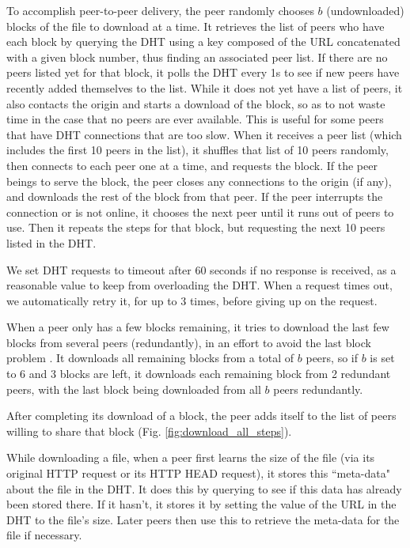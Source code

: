 To accomplish peer-to-peer delivery, the peer randomly chooses $b$ (undownloaded) blocks of the file to download at a time.  
It retrieves the list of peers who have each block by querying the DHT using a key composed of
the URL concatenated with a given block number, thus finding an associated peer list.  
If there are no peers listed yet for that block, it polls the DHT every 1s to see if new peers have recently added themselves to the list.
While it does not yet have a list of peers, it also contacts the origin and starts a download of the block, so as to 
not waste time in the case that no peers are ever available.  This is useful for some peers that have DHT connections that are too slow.
When it receives a peer list (which includes the first 10 peers in the list), it shuffles that list of 10 peers randomly, then connects to each peer one at a time, and requests the block.  
If the peer beings to serve the block, the peer closes any connections to the origin (if any), and downloads the rest of the block from that peer.  If the peer interrupts the connection
or is not online, it chooses the next peer until it runs out of peers to use.  Then it repeats the steps for that block, but requesting the next 10 peers listed in the DHT.

We set DHT requests to timeout after 60 seconds if no response is received, as a reasonable value to keep from 
overloading the DHT.  When a request times out, we automatically retry it, for up to 3 times, before giving up on the request.

When a peer only has a few blocks remaining, it tries to download the last few blocks from several peers (redundantly), in an effort to avoid the last block problem \cite{bram}.  
It downloads all remaining blocks from a total of $b$ peers, so if $b$ is set to 6 and 3 blocks are left, it downloads each remaining block from 2 redundant peers, with the
last block being downloaded from all $b$ peers redundantly.

After completing its download of a block, the peer adds itself to the list of peers willing to share that block (Fig. \ref{fig:download_all_steps}). 

While downloading a file, when a peer first learns the size of the file (via its original HTTP request or its HTTP HEAD request), it stores this ``meta-data" about the file
in the DHT.  It does this by querying to see if this data has already been stored there.  If it hasn't, it stores it by setting the value of the URL in the DHT to the file's size. 
Later peers then use this to retrieve the meta-data for the file if necessary.

